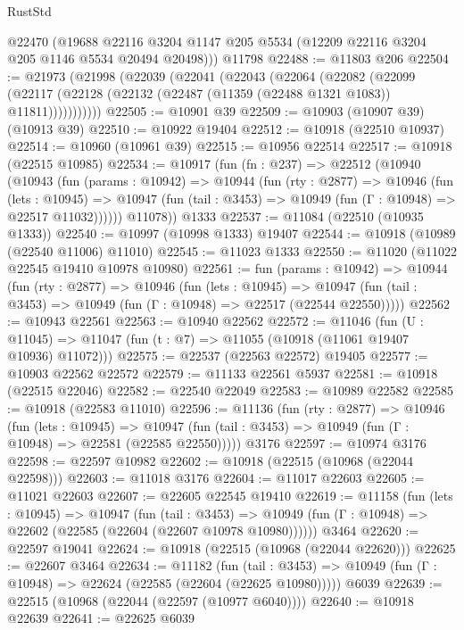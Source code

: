 \begin{lexlean}{RustStd}
\begin{coremodule}
{{{{{{{{{{{{{{{{{{{      @22470
      (@19688 @22116 @3204 @1147 @205 @5534 (@12209 @22116 @3204 @205 @1146 @5534 @20494 @20498)))
    @11798
@22488 := @11803 @206
@22504 := @21973
    (@21998
      (@22039
        (@22041
          (@22043
            (@22064
              (@22082
                (@22099
                  (@22117 (@22128 (@22132 (@22487 (@11359 (@22488 @1321 @1083)) @11811)))))))))))
@22505 := @10901 @39
@22509 := @10903 (@10907 @39) (@10913 @39)
@22510 := @10922 @19404
@22512 := @10918 (@22510 @10937)
@22514 := @10960 (@10961 @39)
@22515 := @10956 @22514
@22517 := @10918 (@22515 @10985)
@22534 := @10917
    (fun (fn : @237) =>
    @22512
      (@10940
        (@10943
          (fun (params : @10942) =>
          @10944
            (fun (rty : @2877) =>
            @10946
              (fun (lets : @10945) =>
              @10947 (fun (tail : @3453) => @10949 (fun (Γ : @10948) => @22517 @11032))))))
        @11078))
    @1333
@22537 := @11084 (@22510 (@10935 @1333))
@22540 := @10997 (@10998 @1333) @19407
@22544 := @10918 (@10989 (@22540 @11006) @11010)
@22545 := @11023 @1333
@22550 := @11020 (@11022 @22545 @19410 @10978 @10980)
@22561 := fun (params : @10942) =>
  @10944
    (fun (rty : @2877) =>
    @10946
      (fun (lets : @10945) =>
      @10947 (fun (tail : @3453) => @10949 (fun (Γ : @10948) => @22517 (@22544 @22550)))))
@22562 := @10943 @22561
@22563 := @10940 @22562
@22572 := @11046
    (fun (U : @11045) => @11047 (fun (t : @7) => @11055 (@10918 (@11061 @19407 @10936) @11072)))
@22575 := @22537 (@22563 @22572) @19405
@22577 := @10903 @22562 @22572
@22579 := @11133 @22561 @5937
@22581 := @10918 (@22515 @22046)
@22582 := @22540 @22049
@22583 := @10989 @22582
@22585 := @10918 (@22583 @11010)
@22596 := @11136
    (fun (rty : @2877) =>
    @10946
      (fun (lets : @10945) =>
      @10947 (fun (tail : @3453) => @10949 (fun (Γ : @10948) => @22581 (@22585 @22550)))))
    @3176
@22597 := @10974 @3176
@22598 := @22597 @10982
@22602 := @10918 (@22515 (@10968 (@22044 @22598)))
@22603 := @11018 @3176
@22604 := @11017 @22603
@22605 := @11021 @22603
@22607 := @22605 @22545 @19410
@22619 := @11158
    (fun (lets : @10945) =>
    @10947
      (fun (tail : @3453) =>
      @10949 (fun (Γ : @10948) => @22602 (@22585 (@22604 (@22607 @10978 @10980))))))
    @3464
@22620 := @22597 @19041
@22624 := @10918 (@22515 (@10968 (@22044 @22620)))
@22625 := @22607 @3464
@22634 := @11182
    (fun (tail : @3453) => @10949 (fun (Γ : @10948) => @22624 (@22585 (@22604 (@22625 @10980)))))
    @6039
@22639 := @22515 (@10968 (@22044 (@22597 (@10977 @6040))))
@22640 := @10918 @22639
@22641 := @22625 @6039
}}}}}}}}}}}}}}}}}}}
\end{coremodule}
\end{lexlean}
